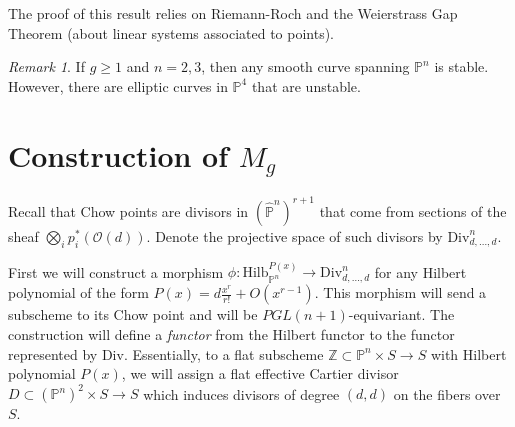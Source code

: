 \documentclass[leqno, openany]{memoir}
\theoremstyle{definition}
\theoremstyle{remark}
\newtheorem{rmk}[thm]{Remark}
\theoremstyle{plain}
\theoremstyle{definition}
\theoremstyle{remark}
\newcommand{\Z}{\mathbb{Z}}
\renewcommand{\P}{\mathbb{P}}
\newcommand{\mc}[1]{\mathcal{#1}}
\newcommand{\mr}[1]{\mathrm{#1}}
\newcommand{\wh}[1]{\widehat{#1}}
\begin{document}
The proof of this result relies on Riemann-Roch and the Weierstrass Gap Theorem (about linear systems associated to points).

\begin{rmk}
    If $g \geq 1$ and $n = 2,3$, then any smooth curve spanning $\P^n$ is stable. However, there are elliptic curves in $\P^4$ that are unstable.
\end{rmk}

\section{Construction of $M_g$}%
\label{sec:connection_to_m_g_}

Recall that Chow points are divisors in $(\wh{\P}^n)^{r+1}$ that come from sections of the sheaf $\bigotimes_i p_i^*(\mc{O}(d))$. Denote the projective space of such divisors by $\mr{Div}_{d, \ldots, d}^n$. 

First we will construct a morphism $\phi \colon \mr{Hilb}_{\P^n}^{P(x)} \to \mr{Div}^n_{d, \ldots, d}$ for any Hilbert polynomial of the form $P(x) = d \frac{x^r}{r!} + O(x^{r-1})$. This morphism will send a subscheme to its Chow point and will be $PGL(n+1)$-equivariant. The construction will define a \textit{functor} from the Hilbert functor to the functor represented by $\mr{Div}$. Essentially, to a flat subscheme $\Z \subset \P^n \times S \to S$ with Hilbert polynomial $P(x)$, we will assign a flat effective Cartier divisor $D \subset (\P^n)^2 \times S \to S$ which induces divisors of degree $(d,d)$ on the fibers over $S$.
\end{document}
